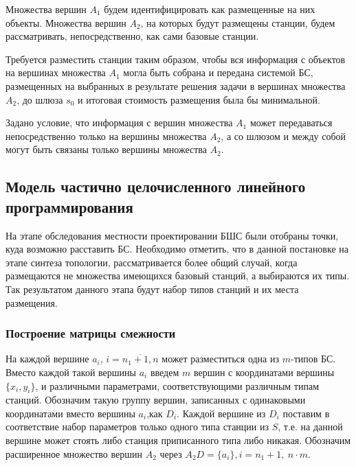 Множества вершин $A_1$ будем идентифицировать как размещенные на них объекты. Множества вершин $A_2$, на которых будут размещены станции, будем рассматривать, непосредственно, как сами базовые станции. 

Требуется разместить станции таким образом, чтобы вся информация с объектов на вершинах множества $A_1$ могла быть собрана и передана системой БС, размещенных на выбранных в результате решения задачи в вершинах множества  $A_2$, до шлюза $s_0$ и итоговая стоимость размещения была бы минимальной.


Задано условие, что информация с вершин множества $A_1$ может передаваться непосредственно только на вершины множества $A_2$, а со шлюзом и между собой могут быть связаны только вершины множества $A_2$.

\subsection{Модель частично целочисленного линейного программирования}

На этапе обследования местности проектировании БШС были отобраны точки, куда возможно расставить БС. Необходимо отметить, что в данной постановке на этапе синтеза топологии, рассматривается более общий случай, когда размещаются не множества имеющихся базовый станций, а выбираются их типы. Так результатом данного этапа будут набор типов станций и их места размещения.

\subsubsection{Построение матрицы смежности}

На каждой вершине $a_i$, $i= \overline{n_1+1,n}$ может разместиться одна из $m$-типов БС. Вместо каждой такой вершины $a_i$ введем $m$ вершин с координатами вершины $\{x_i, y_i \}$, и различными параметрами, соответствующими различным типам станций. Обозначим такую группу вершин, записанных с одинаковыми координатами вместо вершины $a_i$,как $D_i$. Каждой вершине из $D_i$ поставим в соответствие набор параметров только одного типа станции из $S$, т.е. на данной вершине может стоять либо станция приписанного типа либо никакая. Обозначим расширенное множество вершин $A_2$ через $A_2D = \{a_i\}, i = \overline{n_1 + 1,\ n \cdot m}$.



